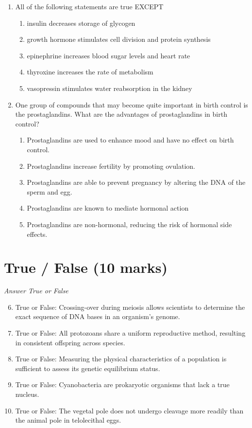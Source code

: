 \documentclass[12pt]{article}
\begin{document}
\begin{enumerate}[label=\arabic*.]
\item All of the following statements are true EXCEPT
\begin{enumerate}[label=(\alph*)]
    \item insulin decreases storage of glycogen
    \item growth hormone stimulates cell division and protein synthesis
    \item epinephrine increases blood sugar levels and heart rate
    \item thyroxine increases the rate of metabolism
    \item vasopressin stimulates water reabsorption in the kidney
\end{enumerate}
\item One group of compounds that may become quite important in birth control is the prostaglandins. What are the advantages of prostaglandins in birth control?
\begin{enumerate}[label=(\alph*)]
    \item Prostaglandins are used to enhance mood and have no effect on birth control.
    \item Prostaglandins increase fertility by promoting ovulation.
    \item Prostaglandins are able to prevent pregnancy by altering the DNA of the sperm and egg.
    \item Prostaglandins are known to mediate hormonal action
    \item Prostaglandins are non-hormonal, reducing the risk of hormonal side effects.
\end{enumerate}
\end{enumerate}

\section*{True / False (10 marks)}
\textit{Answer True or False}
\begin{enumerate}[label=\arabic*.]
\setcounter{enumi}{5}
\item True or False: Crossing-over during meiosis allows scientists to determine the exact sequence of DNA bases in an organism's genome.
\item True or False: All protozoans share a uniform reproductive method, resulting in consistent offspring across species.
\item True or False: Measuring the physical characteristics of a population is sufficient to assess its genetic equilibrium status.
\item True or False: Cyanobacteria are prokaryotic organisms that lack a true nucleus.
\item True or False: The vegetal pole does not undergo cleavage more readily than the animal pole in telolecithal eggs.
\end{enumerate}
\end{document}
